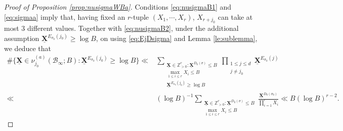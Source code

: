 \documentclass[11pt,letterpaper]{amsart}
\newcommand{\BZ}{{\mathbb {Z}}}
\newcommand{\CB}{{\mathcal {B}}}
\newcommand{\XX}{\underline{\mathbf{X}}}
\theoremstyle{plain}
\numberwithin{equation}{section}
\theoremstyle{definition}
\theoremstyle{remark}
\begin{document}
\begin{proof}[Proof of Proposition \ref{prop:nusigmaWBa}]
Conditions \eqref{eq:nusigmaB1} and \eqref{eq:sigmaa} imply that, having fixed an $r$-tuple $(X_1,\cdots,X_r)$, $X_{r+j_0}$ can take at most $3$ different values. Together with \eqref{eq:nusigmaB2},  under the additional assumption $\XX^{E_{\sigma_0}(j_0)}\geqslant \log B$, on using \eqref{eq:EjDsigma} and Lemma \ref{le:sublemma}, we deduce that
\begin{align*}
	 \#\{\XX\in\nu_{j_0}^{(a)}(\CB_\infty;B):\XX^{E_{\sigma_0}(j_0)}\geqslant \log B\}\ll &\sum_{\substack{\XX\in\BZ_{>0}^r:\XX^{D_0(\sigma)}\leqslant B\\ \max_{1\leqslant i\leqslant r}X_i\leqslant B\\ \XX^{E_{\sigma_0}(j_0)}\geqslant \log B}}\prod_{\substack{1\leqslant j\leqslant d\\ j\neq j_0}} \XX^{E_{\sigma_0}(j)}\\ \ll &(\log B)^{-1}\sum_{\substack{\XX\in\BZ_{>0}^r:\XX^{D_0(\sigma)}\leqslant B\\ \max_{1\leqslant i\leqslant r}X_i\leqslant B}}\frac{\XX^{D_0(\sigma_0)}}{\prod_{i=1}^{r}X_i}\ll B(\log B)^{r-2}.
\end{align*} 


\end{proof}
\end{document}
